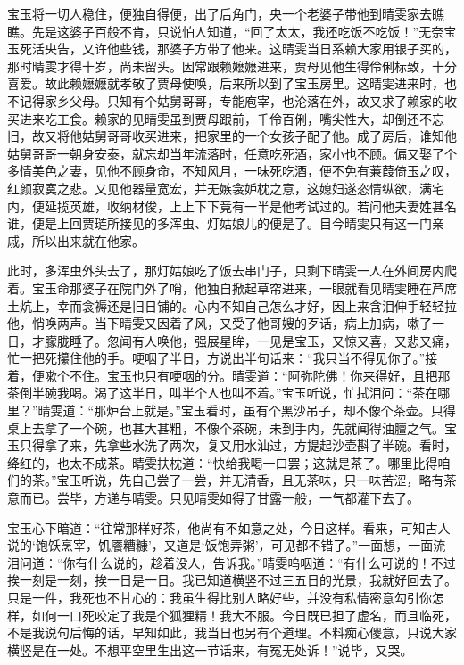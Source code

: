 \documentclass[12pt,oneside]{book}
\begin{document}
宝玉将一切人稳住，便独自得便，出了后角门，央一个老婆子带他到晴雯家去瞧瞧。先是这婆子百般不肯，只说怕人知道，“回了太太，我还吃饭不吃饭！”无奈宝玉死活央告，又许他些钱，那婆子方带了他来。这晴雯当日系赖大家用银子买的，那时晴雯才得十岁，尚未留头。因常跟赖嬷嬷进来，贾母见他生得伶俐标致，十分喜爱。故此赖嬷嬷就孝敬了贾母使唤，后来所以到了宝玉房里。这晴雯进来时，也不记得家乡父母。只知有个姑舅哥哥，专能庖宰，也沦落在外，故又求了赖家的收买进来吃工食。赖家的见晴雯虽到贾母跟前，千伶百俐，嘴尖性大，却倒还不忘旧，故又将他姑舅哥哥收买进来，把家里的一个女孩子配了他。成了房后，谁知他姑舅哥哥一朝身安泰，就忘却当年流落时，任意吃死酒，家小也不顾。偏又娶了个多情美色之妻，见他不顾身命，不知风月，一味死吃酒，便不免有蒹葭倚玉之叹，红颜寂寞之悲。又见他器量宽宏，并无嫉衾妒枕之意，这媳妇遂恣情纵欲，满宅内，便延揽英雄，收纳材俊，上上下下竟有一半是他考试过的。若问他夫妻姓甚名谁，便是上回贾琏所接见的多浑虫、灯姑娘儿的便是了。目今晴雯只有这一门亲戚，所以出来就在他家。

此时，多浑虫外头去了，那灯姑娘吃了饭去串门子，只剩下晴雯一人在外间房内爬着。宝玉命那婆子在院门外了哨，他独自掀起草帘进来，一眼就看见晴雯睡在芦席土炕上，幸而衾褥还是旧日铺的。心内不知自己怎么才好，因上来含泪伸手轻轻拉他，悄唤两声。当下晴雯又因着了风，又受了他哥嫂的歹话，病上加病，嗽了一日，才朦胧睡了。忽闻有人唤他，强展星眸，一见是宝玉，又惊又喜，又悲又痛，忙一把死攥住他的手。哽咽了半日，方说出半句话来：“我只当不得见你了。”接着，便嗽个不住。宝玉也只有哽咽的分。晴雯道：“阿弥陀佛！你来得好，且把那茶倒半碗我喝。渴了这半日，叫半个人也叫不着。”宝玉听说，忙拭泪问：“茶在哪里？”晴雯道：“那炉台上就是。”宝玉看时，虽有个黑沙吊子，却不像个茶壶。只得桌上去拿了一个碗，也甚大甚粗，不像个茶碗，未到手内，先就闻得油膻之气。宝玉只得拿了来，先拿些水洗了两次，复又用水汕过，方提起沙壶斟了半碗。看时，绛红的，也太不成茶。晴雯扶枕道：“快给我喝一口罢；这就是茶了。哪里比得咱们的茶。”宝玉听说，先自己尝了一尝，并无清香，且无茶味，只一味苦涩，略有茶意而已。尝毕，方递与晴雯。只见晴雯如得了甘露一般，一气都灌下去了。

宝玉心下暗道：“往常那样好茶，他尚有不如意之处，今日这样。看来，可知古人说的‘饱饫烹宰，饥餍糟糠’，又道是‘饭饱弄粥’，可见都不错了。”一面想，一面流泪问道：“你有什么说的，趁着没人，告诉我。”晴雯呜咽道：“有什么可说的！不过挨一刻是一刻，挨一日是一日。我已知道横竖不过三五日的光景，我就好回去了。只是一件，我死也不甘心的：我虽生得比别人略好些，并没有私情密意勾引你怎样，如何一口死咬定了我是个狐狸精！我大不服。今日既已担了虚名，而且临死，不是我说句后悔的话，早知如此，我当日也另有个道理。不料痴心傻意，只说大家横竖是在一处。不想平空里生出这一节话来，有冤无处诉！”说毕，又哭。
\end{document}
